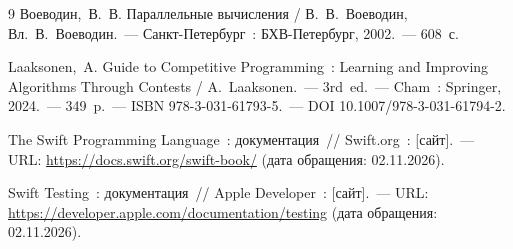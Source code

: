 \clearpage
{}
{}
\renewcommand{\refname}{СПИСОК ИСПОЛЬЗОВАННЫХ ИСТОЧНИКОВ}
\begin{thebibliography}{9}
Воеводин,~В.~В. Параллельные вычисления / В.~В.~Воеводин, Вл.~В.~Воеводин.~---
Санкт-Петербург~: БХВ-Петербург, 2002.~--- 608~с.

Laaksonen,~A. Guide to Competitive Programming~: Learning and Improving
Algorithms Through Contests / A.~Laaksonen.~--- 3rd~ed.~--- Cham~: Springer,
2024.~--- 349~p.~--- ISBN 978-3-031-61793-5.~--- DOI 10.1007/978-3-031-61794-2.

The Swift Programming Language~: документация~// Swift.org~: [сайт].~---
URL: \url{https://docs.swift.org/swift-book/} (дата обращения: 02.11.2026).

Swift Testing~: документация~// Apple Developer~: [сайт].~---
URL: \url{https://developer.apple.com/documentation/testing}
(дата обращения: 02.11.2026).
\end{thebibliography}
